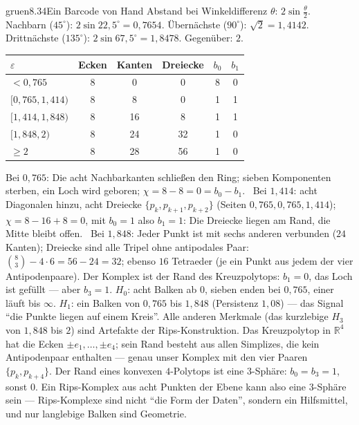 \begin{loesungkarte}{gruen}{8.34}{Ein Barcode von Hand}
Abstand bei Winkeldifferenz $\theta$: $2\sin\frac\theta2$. Nachbarn ($45^{\circ}$): $2\sin22{,}5^{\circ} = 0{,}7654$. Übernächste ($90^{\circ}$): $\sqrt2 = 1{,}4142$. Drittnächste ($135^{\circ}$): $2\sin67{,}5^{\circ} = 1{,}8478$. Gegenüber: $2$.
\begin{center}\small
\begin{tabular}{l|ccc|cc}
$\varepsilon$ & Ecken & Kanten & Dreiecke & $b_0$ & $b_1$\\ \hline
$< 0{,}765$ & 8 & 0 & 0 & 8 & 0\\
$[0{,}765, 1{,}414)$ & 8 & 8 & 0 & 1 & 1\\
$[1{,}414, 1{,}848)$ & 8 & 16 & 8 & 1 & 1\\
$[1{,}848, 2)$ & 8 & 24 & 32 & 1 & 0\\
$\ge2$ & 8 & 28 & 56 & 1 & 0
\end{tabular}
\end{center}
Bei $0{,}765$: Die acht Nachbarkanten schließen den Ring; sieben Komponenten sterben, ein Loch wird geboren; $\chi = 8 - 8 = 0 = b_0 - b_1$. \checkmark\ Bei $1{,}414$: acht Diagonalen hinzu, acht Dreiecke $\{p_k, p_{k+1}, p_{k+2}\}$ (Seiten $0{,}765, 0{,}765, 1{,}414$); $\chi = 8 - 16 + 8 = 0$, mit $b_0 = 1$ also $b_1 = 1$: Die Dreiecke liegen am Rand, die Mitte bleibt offen. \checkmark\ Bei $1{,}848$: Jeder Punkt ist mit sechs anderen verbunden ($24$ Kanten); Dreiecke sind alle Tripel ohne antipodales Paar: $\binom83 - 4\cdot6 = 56 - 24 = 32$; ebenso $16$ Tetraeder (je ein Punkt aus jedem der vier Antipodenpaare). Der Komplex ist der Rand des Kreuzpolytops: $b_1 = 0$, das Loch ist gefüllt --- aber $b_3 = 1$.
$H_0$: acht Balken ab $0$, sieben enden bei $0{,}765$, einer läuft bis $\infty$. $H_1$: ein Balken von $0{,}765$ bis $1{,}848$ (Persistenz $1{,}08$) --- das Signal \enquote{die Punkte liegen auf einem Kreis}. Alle anderen Merkmale (das kurzlebige $H_3$ von $1{,}848$ bis $2$) sind Artefakte der Rips-Konstruktion.
Das Kreuzpolytop in $\mathbb R^{4}$ hat die Ecken $\pm e_1, \dots, \pm e_4$; sein Rand besteht aus allen Simplizes, die kein Antipodenpaar enthalten --- genau unser Komplex mit den vier Paaren $\{p_k, p_{k+4}\}$. Der Rand eines konvexen $4$-Polytops ist eine $3$-Sphäre: $b_0 = b_3 = 1$, sonst $0$. Ein Rips-Komplex aus acht Punkten der Ebene kann also eine $3$-Sphäre sein --- Rips-Komplexe sind nicht \enquote{die Form der Daten}, sondern ein Hilfsmittel, und nur langlebige Balken sind Geometrie.

\end{loesungkarte}
